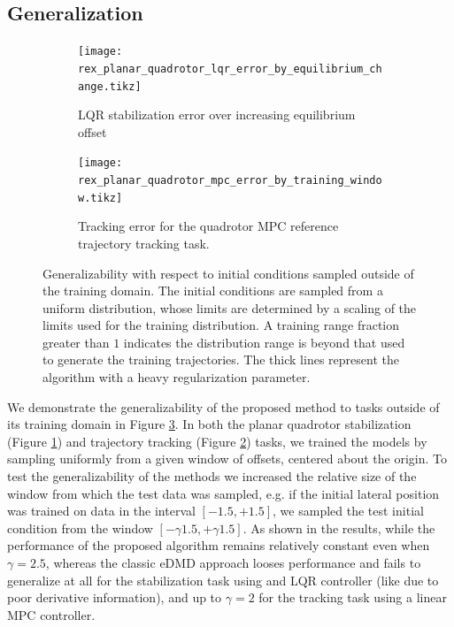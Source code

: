 \documentclass{article}
\begin{document}
\subsection{Generalization}
\begin{figure}[t] \centering
  \begin{subfigure}[t]{0.49\textwidth}
    \centering
    \texttt{[image: rex\_planar\_quadrotor\_lqr\_error\_by\_equilibrium\_change.tikz]}
    \caption{LQR stabilization error over increasing equilibrium offset}
    \label{fig:rex_planar_quadrotor_lqr_error_by_equilibrium_change}
  \end{subfigure}
  \hfill
  \begin{subfigure}[t]{0.48\textwidth}
    \raggedright
    \texttt{[image: rex\_planar\_quadrotor\_mpc\_error\_by\_training\_window.tikz]}
    \caption{Tracking error for the quadrotor MPC reference trajectory tracking task.}
    \label{fig:rex_planar_quadrotor_mpc_error_by_training_window}
  \end{subfigure}
  \caption{Generalizability with respect to initial conditions sampled outside of the 
  training domain. The initial conditions are sampled from a uniform distribution, whose 
  limits are determined by a scaling of the limits used for the training distribution. 
  A training range fraction greater than $1$ indicates the
  distribution range is beyond that used to generate the training trajectories. The thick 
  lines represent the algorithm with a heavy regularization parameter.
  }
  \label{fig:training_window}
\end{figure}


We demonstrate the generalizability of the proposed method to tasks outside of its training
domain in Figure \ref{fig:training_window}. In both the planar quadrotor 
stabilization (Figure \ref{fig:rex_planar_quadrotor_lqr_error_by_equilibrium_change}) and 
trajectory tracking (Figure \ref{fig:rex_planar_quadrotor_mpc_error_by_training_window})
tasks, we trained the models by sampling uniformly from a given window of offsets, centered 
about the origin. 
To test the generalizability of the methods we increased the relative size of the window 
from which the test data was sampled, e.g. if the initial lateral position was trained on 
data in the interval $[-1.5,+1.5]$, we sampled the test initial condition from the window 
$[-\gamma 1.5, +\gamma 1.5]$. As shown in the results, while the performance of the proposed
algorithm remains relatively constant even when $\gamma = 2.5$, whereas the classic eDMD 
approach looses performance and fails to generalize at all for the stabilization task using 
and LQR controller (like due to poor derivative information), and up to $\gamma = 2$ for the 
tracking task using a linear MPC controller.
\end{document}
